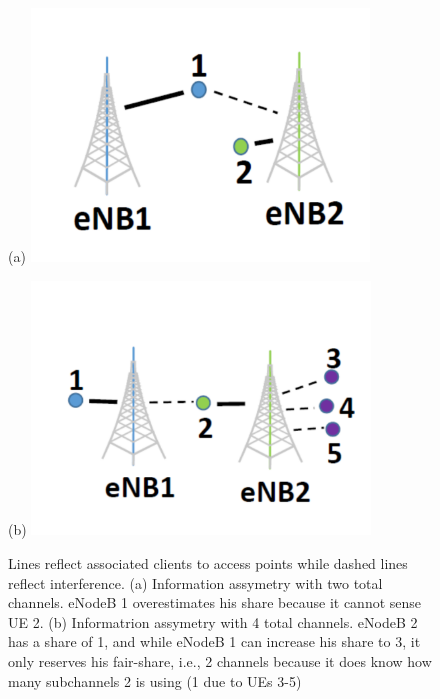 \begin{figure}[htb!]
\vspace{-10pt}
  \begin{minipage}{0.20\textwidth}
    \centering
    (a)
    \vfill
    \includegraphics[width= 0.8\textwidth,height=0.5\columnwidth]{./figs/over.pdf}
  \end{minipage}
  \begin{minipage}{0.20\textwidth}
    \centering
    (b)
    \vfill
  \includegraphics[width= 0.8\textwidth,height=0.5\columnwidth]{./figs/under.pdf}
  \end{minipage}
  \hfill
  \caption{\small{Lines reflect associated clients to access points while dashed lines reflect interference. (a) Information assymetry with two total channels. eNodeB 1 overestimates his share because it cannot sense UE 2. (b) Informatrion assymetry with 4 total channels. eNodeB 2 has a
share of 1, and while eNodeB 1 can increase his share to 3, it only reserves his fair-share, i.e., 2
channels because it does know how many subchannels 2 is using (1 due to UEs 3-5)}}
  \label{fig:asym}
\vspace{-15pt}

\end{figure}


